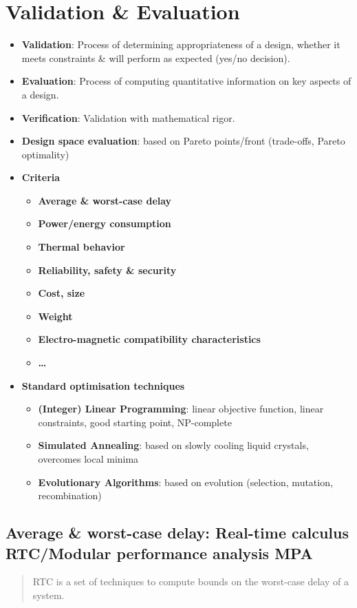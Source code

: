 \documentclass{article}
\begin{document}
\section{Validation \& Evaluation}
\begin{itemize}
  \item \textbf{Validation}: Process of determining appropriateness of a design, whether it meets constraints \& will perform as expected (yes/no decision).
  \item \textbf{Evaluation}: Process of computing quantitative information on key aspects of a design.
  \item \textbf{Verification}: Validation with mathematical rigor.
  \item \textbf{Design space evaluation}: based on Pareto points/front (trade-offs, Pareto optimality)
  \item \textbf{Criteria}
        \begin{itemize}
          \item \textbf{Average \& worst-case delay}
          \item \textbf{Power/energy consumption}
          \item \textbf{Thermal behavior}
          \item \textbf{Reliability, safety \& security}
          \item \textbf{Cost, size}
          \item \textbf{Weight}
          \item \textbf{Electro-magnetic compatibility characteristics}
          \item \textbf{…}
        \end{itemize}
  \item \textbf{Standard optimisation techniques}
        \begin{itemize}
          \item \textbf{(Integer) Linear Programming}: linear objective function, linear constraints, good starting point, NP-complete
          \item \textbf{Simulated Annealing}: based on slowly cooling liquid crystals, overcomes local minima
          \item \textbf{Evolutionary Algorithms}: based on evolution (selection, mutation, recombination)
        \end{itemize}
\end{itemize}

\subsection{Average \& worst-case delay: Real-time calculus RTC/Modular performance analysis MPA}
\begin{quote}RTC is a set of techniques to compute bounds on the worst-case delay of a system.\end{quote}
\end{document}
